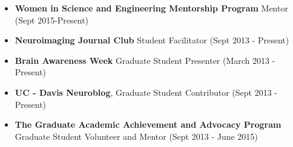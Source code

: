 \documentclass[line,margin,10pt]{res}
\begin{document}
\begin{resume}
\begin{itemize}[leftmargin=-2pt]

\item[] \textbf{Women in Science and Engineering Mentorship Program} Mentor (Sept 2015-Present)

\item[]\textbf{Neuroimaging Journal Club} Student Facilitator (Sept 2013 - Present)

\item[]\textbf{Brain Awareness Week} Graduate Student Presenter (March 2013 - Present)

\item[]\textbf{UC - Davis Neuroblog}, Graduate Student Contributor (Sept 2013 - Present)

\item[]\textbf{The Graduate Academic Achievement and Advocacy Program} Graduate Student Volunteer and Mentor (Sept 2013 - June 2015)


\end{itemize}
\end{resume}
\end{document}
